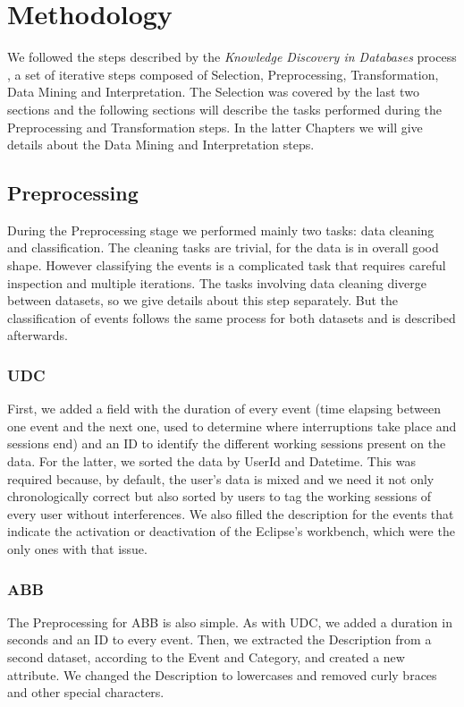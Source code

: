 \section{Methodology}
We followed the steps described by the \emph{Knowledge Discovery in Databases} process \cite{FPG96}, a set of iterative steps composed of Selection, Preprocessing, Transformation, Data Mining and Interpretation. The Selection was covered by the last two sections and the following sections will describe the tasks performed during the Preprocessing and Transformation steps. In the latter Chapters we will give details about the Data Mining and Interpretation steps.

\subsection{Preprocessing}
During the Preprocessing stage we performed mainly two tasks: data cleaning and classification. The cleaning tasks are trivial, for the data is in overall good shape. However classifying the events is a complicated task that requires careful inspection and multiple iterations. The tasks involving data cleaning diverge between datasets, so we give details about this step separately. But the classification of events follows the same process for both datasets and is described afterwards.

\subsubsection{UDC}
First, we added a field with the duration of every event (time elapsing between one event and the next one, used to determine where interruptions take place and sessions end) and an ID to identify the different working sessions present on the data. For the latter, we sorted the data by UserId and Datetime. This was required because, by default, the user's data is mixed and we need it not only chronologically correct but also sorted by users to tag the working sessions of every user without interferences. We also filled the description for the events that indicate the activation or deactivation of the Eclipse's workbench, which were the only ones with that issue.

\subsubsection{ABB}
The Preprocessing for ABB is also simple. As with UDC, we added a duration in seconds and an ID to every event. Then, we extracted the Description from a second dataset, according to the Event and Category, and created a new attribute. We changed the Description to lowercases and removed curly braces and other special characters. 

